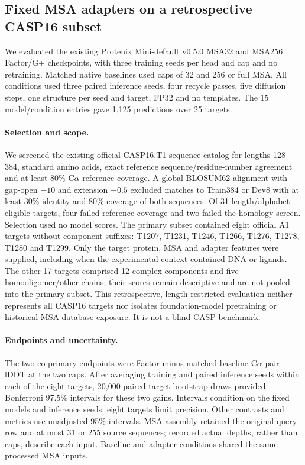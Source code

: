 \subsection{Fixed MSA adapters on a retrospective CASP16 subset}
\label{app:casp16}

We evaluated the existing Protenix Mini-default v0.5.0 MSA32 and MSA256
Factor/G+ checkpoints, with three training seeds per head and cap and no
retraining. Matched native baselines used caps of 32 and 256 or full MSA.
All conditions used three paired inference seeds, four recycle passes,
five diffusion steps, one structure per seed and target, FP32 and no templates.
The 15 model/condition entries gave 1,125 predictions over 25 targets.

\paragraph{Selection and scope.}
We screened the existing official CASP16.T1 sequence catalog for lengths
128--384, standard amino acids, exact reference sequence/residue-number
agreement and at least 80\% C$\alpha$ reference coverage. A global BLOSUM62
alignment with gap-open $-10$ and extension $-0.5$ excluded matches to
Train384 or Dev8 with at least 30\% identity and 80\% coverage of both
sequences. Of 31 length/alphabet-eligible targets, four failed reference
coverage and two failed the homology screen. Selection used no model scores.
The primary subset contained eight official A1 targets without component
suffixes: T1207, T1231, T1246, T1266, T1276, T1278, T1280 and T1299.
Only the target protein, MSA and adapter features were supplied, including
when the experimental context contained DNA or ligands. The other 17
targets comprised 12 complex components and five homooligomer/other chains;
their scores remain descriptive and are not pooled into the primary subset.
This retrospective, length-restricted evaluation neither represents all
CASP16 targets nor isolates foundation-model pretraining or historical MSA
database exposure. It is not a blind CASP benchmark.

\paragraph{Endpoints and uncertainty.}
The two co-primary endpoints were Factor-minus-matched-baseline C$\alpha$
pair-lDDT at the two caps. After averaging training and paired inference
seeds within each of the eight targets, 20,000 paired target-bootstrap
draws provided Bonferroni 97.5\% intervals for these two gains. Intervals
condition on the fixed models and inference seeds; eight targets limit
precision. Other contrasts and metrics use unadjusted 95\% intervals.
MSA assembly retained the original query row and at most 31 or 255 source
sequences; recorded actual depths, rather than caps, describe each input.
Baseline and adapter conditions shared the same processed MSA inputs.


